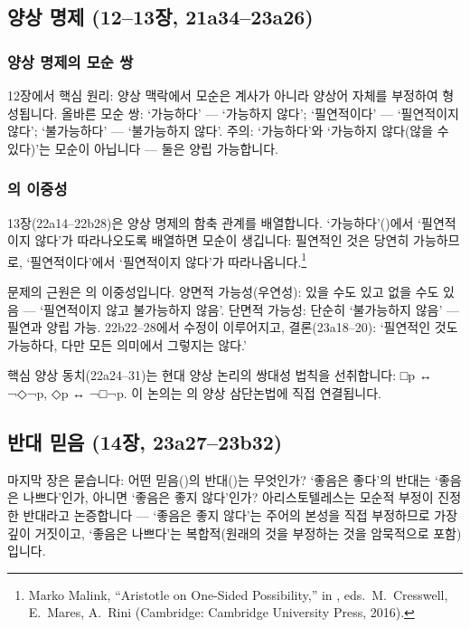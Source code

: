\documentclass[12pt, a4paper]{article}
\begin{document}
\subsection{양상 명제 (12--13장, 21a34--23a26)}

\subsubsection{양상 명제의 모순 쌍}

12장에서 핵심 원리: 양상 맥락에서 모순은 계사가 아니라 양상어 자체를 부정하여 형성됩니다. 올바른 모순 쌍: `가능하다' --- `가능하지 않다'; `필연적이다' --- `필연적이지 않다'; `불가능하다' --- `불가능하지 않다'. 주의: `가능하다'와 `가능하지 않다(않을 수 있다)'는 모순이 아닙니다 --- 둘은 양립 가능합니다.

\subsubsection{의 이중성}

13장(22a14--22b28)은 양상 명제의 함축 관계를 배열합니다. `가능하다'()에서 `필연적이지 않다'가 따라나오도록 배열하면 모순이 생깁니다: 필연적인 것은 당연히 가능하므로, `필연적이다'에서 `필연적이지 않다'가 따라나옵니다.\footnote{Marko Malink, ``Aristotle on One-Sided Possibility,'' in , eds.\ M.\ Cresswell, E.\ Mares, A.\ Rini (Cambridge: Cambridge University Press, 2016).}

문제의 근원은 의 이중성입니다. 양면적 가능성(우연성): 있을 수도 있고 없을 수도 있음 --- `필연적이지 않고 불가능하지 않음'. 단면적 가능성: 단순히 `불가능하지 않음' --- 필연과 양립 가능. 22b22--28에서 수정이 이루어지고, 결론(23a18--20): `필연적인 것도 가능하다, 다만 모든 의미에서 그렇지는 않다.'

핵심 양상 동치(22a24--31)는 현대 양상 논리의 쌍대성 법칙을 선취합니다: □p ↔ ¬◇¬p, ◇p ↔ ¬□¬p. 이 논의는 의 양상 삼단논법에 직접 연결됩니다.

\subsection{반대 믿음 (14장, 23a27--23b32)}

마지막 장은 묻습니다: 어떤 믿음()의 반대()는 무엇인가? `좋음은 좋다'의 반대는 `좋음은 나쁘다'인가, 아니면 `좋음은 좋지 않다'인가? 아리스토텔레스는 모순적 부정이 진정한 반대라고 논증합니다 --- `좋음은 좋지 않다'는 주어의 본성을 직접 부정하므로 가장 깊이 거짓이고, `좋음은 나쁘다'는 복합적(원래의 것을 부정하는 것을 암묵적으로 포함)입니다.
\end{document}
